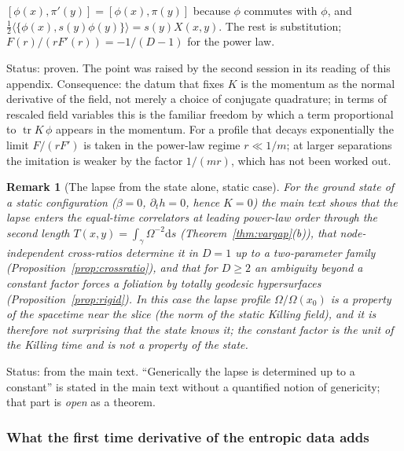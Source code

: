 \documentclass[11pt,a4paper]{article}
\makeatletter
\theoremstyle{stmt}
\theoremstyle{defn}
\theoremstyle{rmk}
\newtheorem{remark}[theorem]{Remark}
\renewenvironment{proof}[1][\proofname]{\par\pushQED{\qed}\normalfont\topsep6\p@\@plus6\p@\relax
  \trivlist\item[\hskip\labelsep{\sffamily\itshape\small #1.}]\ignorespaces}{\popQED\endtrivlist\@endpefalse}
\numberwithin{equation}{section}
\DeclareMathOperator{\tr}{tr}
\newcommand{\status}[1]{\par\noindent\textsf{\small Status: #1}\par}
\newcommand{\dd}{\mathrm{d}}
\makeatother
\begin{document}
{\begin{proof}
$[\phi(x),\pi'(y)]=[\phi(x),\pi(y)]$ because $\phi$ commutes with $\phi$, and $\tfrac12\langle\{\phi(x),s(y)\phi(y)\}\rangle=s(y)X(x,y)$. The rest is substitution; $F(r)/(rF'(r))=-1/(D-1)$ for the power law.
\end{proof}
\status{proven. The point was raised by the second session in its reading of this appendix. Consequence: the datum that fixes $K$ is the momentum as the normal derivative of the field, not merely a choice of conjugate quadrature; in terms of rescaled field variables this is the familiar freedom by which a term proportional to $\tr K\,\phi$ appears in the momentum. For a profile that decays exponentially the limit $F/(rF')$ is taken in the power-law regime $r\ll1/m$; at larger separations the imitation is weaker by the factor $1/(mr)$, which has not been worked out.}

\begin{remark}[The lapse from the state alone, static case]\label{rem:static}
For the ground state of a static configuration ($\beta=0$, $\partial_th=0$, hence $K=0$) the main text shows that the lapse enters the equal-time correlators at leading power-law order through the second length $T(x,y)=\int_\gamma\Omega^{-2}\dd s$ (Theorem~\ref{thm:vargap}(b)), that node-independent cross-ratios determine it in $D=1$ up to a two-parameter family (Proposition~\ref{prop:crossratio}), and that for $D\ge2$ an ambiguity beyond a constant factor forces a foliation by totally geodesic hypersurfaces (Proposition~\ref{prop:rigid}). In this case the lapse profile $\Omega/\Omega(x_0)$ is a property of the spacetime near the slice (the norm of the static Killing field), and it is therefore not surprising that the state knows it; the constant factor is the unit of the Killing time and is not a property of the state.
\end{remark}
\status{from the main text. ``Generically the lapse is determined up to a constant'' is stated in the main text without a quantified notion of genericity; that part is \emph{open} as a theorem.}

\subsubsection{What the first time derivative of the entropic data adds}

}
\end{document}
